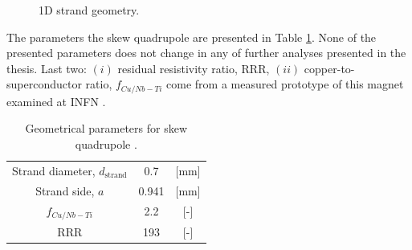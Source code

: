 \begin{figure}[h!]
    \centering
    \caption{1D strand geometry.}
    \label{fig: 1d_strand_geometry}
\end{figure}

The parameters the skew quadrupole are presented in Table \ref{table:skew_quad_params_table}. None of the presented parameters does not change in any of further analyses presented in the thesis. Last two: $(i)$ residual resistivity ratio, RRR, $(ii)$ copper-to-superconductor ratio, $f_{Cu/Nb-Ti}$ come from a measured prototype of this magnet examined at INFN \cite{marco_prioli_mails}.

\begin{table}[h!]
    \caption{Geometrical parameters for skew quadrupole \cite{hl_lhc_tech_design_report_v01, marco_prioli_mails}.} 
    \vspace{-1.em} 
    \fontsize{10}{10}
    \selectfont 
    \renewcommand{\arraystretch}{1.5}
    \begin{center}
    \begin{tabular}{ ccc }  
    \hline
    Strand diameter, $d_\text{strand}$ & 0.7 & [mm] \\
    Strand side, $a$ & 0.941 & [mm] \\
    $f_{Cu/Nb-Ti}$ & 2.2 & [-] \\
    RRR & 193 & [-] \\  
    \hline 
    \end{tabular}
    \end{center}  
     \label{table:skew_quad_params_table} 
 \end{table}
